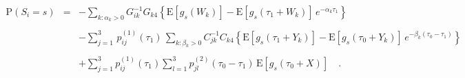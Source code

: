 \documentclass[11pt]{article}
\begin{document}
  \begin{equation}
  \label{eq:likelihood_single}
\begin{array}{lcl}
\mathrm{P}(S_{i}=s)&=&-\displaystyle\sum_{k:\alpha_{k}>0}G^{-1}_{ik}G_{k4}\left\lbrace\mathrm{E}[g_{s}(W_{k})]-\mathrm{E}[g_{s}(\tau_{1}+W_{k})] \,e^{-\alpha_{k}\tau_{1}} \right\rbrace \\
\\
&&-\displaystyle \sum_{j=1}^{3}\,p^{(1)}_{ij}(\tau_{1})\, \displaystyle\sum_{k:\beta_{k}>0}C_{jk}^{-1}C_{k4}\left\lbrace\mathrm{E}[g_{s}(\tau_{1}+Y_{k})]
-\mathrm{E}[g_{s}(\tau_{0}+Y_{k})]\, e^{-\beta_{k}(\tau_{0}-\tau_{1})} \right\rbrace\\
\\
&&+\displaystyle\sum_{j=1}^{3} p^{(1)}_{ij}(\tau_{1})\displaystyle\sum_{l=1}^{3}p^{(2)}_{jl}(\tau_{0}-\tau_{1})\,\mathrm{E}[g_{s}(\tau_{0}+X)] \quad.
\end{array}
\end{equation} 
\normalsize
%
\end{document}
